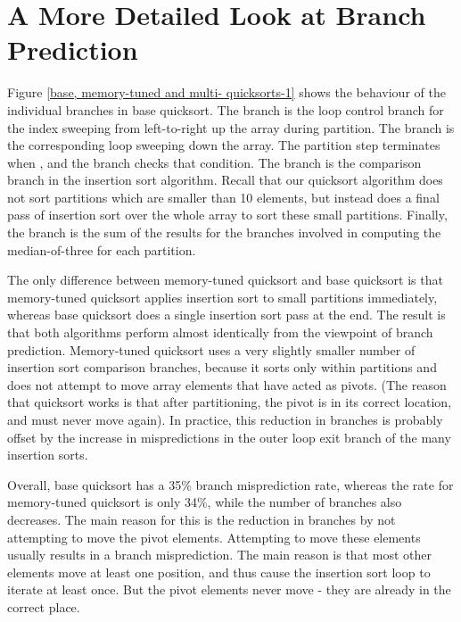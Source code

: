\section{A More Detailed Look at Branch Prediction}


Figure \ref{base, memory-tuned and multi- quicksorts-1} shows the behaviour of
the individual branches in base quicksort. The  branch is the loop control
branch for the index sweeping from left-to-right up the array during partition.
The  branch is the corresponding loop sweeping down the array. The
partition step terminates when , and the  branch
checks that condition. The  branch is the comparison branch in the
insertion sort algorithm. Recall that our quicksort algorithm does not sort
partitions which are smaller than 10 elements, but instead does a final pass of
insertion sort over the whole array to sort these small partitions. Finally, the
 branch is the sum of the results for the branches involved in
computing the median-of-three for each partition.

The only difference between memory-tuned quicksort and base quicksort is that
memory-tuned quicksort applies insertion sort to small partitions immediately,
whereas base quicksort does a single insertion sort pass at the end. The result
is that both algorithms perform almost identically from the viewpoint of branch
prediction. Memory-tuned quicksort uses a very slightly smaller number of
insertion sort comparison branches, because it sorts only within partitions and
does not attempt to move array elements that have acted as pivots. (The reason
that quicksort works is that after partitioning, the pivot is in its correct
location, and must never move again). In practice, this reduction in branches is
probably offset by the increase in mispredictions in the outer loop exit branch
of the many insertion sorts.

Overall, base quicksort has a 35\% branch misprediction rate, whereas the rate
for memory-tuned quicksort is only 34\%, while the number of branches also
decreases. The main reason for this is the reduction in branches by not
attempting to move the pivot elements. Attempting to move these elements usually
results in a branch misprediction. The main reason is that most other elements
move at least one position, and thus cause the insertion sort loop to iterate at
least once. But the pivot elements never move - they are already in the correct
place.

